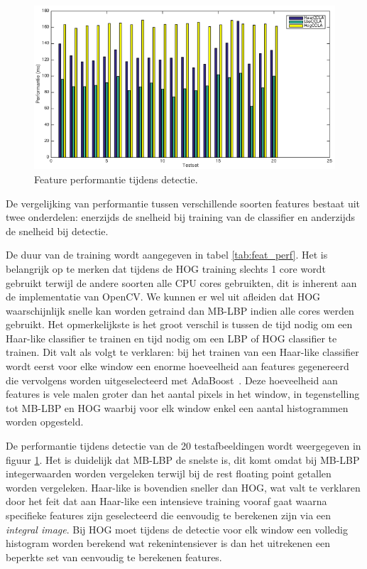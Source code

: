 \begin{figure}
  \centering
  \includegraphics[width=\linewidth]{img/FeaturePerf}
  \caption{Feature performantie tijdens detectie.}
  \label{fig:featPerf}
\end{figure}

De vergelijking van performantie tussen verschillende soorten features bestaat uit twee onderdelen: enerzijds de snelheid bij training van de classifier en anderzijds de snelheid bij detectie.

De duur van de training wordt aangegeven in tabel \ref{tab:feat_perf}. Het is belangrijk op te merken dat tijdens de HOG training slechts 1 core wordt gebruikt terwijl de andere soorten alle CPU cores gebruikten, dit is inherent aan de implementatie van OpenCV. We kunnen er wel uit afleiden dat HOG waarschijnlijk snelle kan worden getraind dan MB-LBP indien alle cores werden gebruikt. Het opmerkelijkste is het groot verschil is tussen de tijd nodig om een Haar-like classifier te trainen en tijd nodig om een LBP of HOG classifier te trainen. Dit valt als volgt te verklaren: bij het trainen van een Haar-like classifier wordt eerst voor elke window een enorme hoeveelheid aan features gegenereerd die vervolgens worden uitgeselecteerd met AdaBoost~\cite{freund1995desicion}. Deze hoeveelheid aan features is vele malen groter dan het aantal pixels in het window, in tegenstelling tot MB-LBP en HOG waarbij voor elk window enkel een aantal histogrammen worden opgesteld.

De performantie tijdens detectie van de 20 testafbeeldingen wordt weergegeven in figuur \ref{fig:featPerf}. Het is duidelijk dat MB-LBP de snelste is, dit komt omdat bij MB-LBP integerwaarden worden vergeleken terwijl bij de rest floating point getallen worden vergeleken. Haar-like is bovendien sneller dan HOG, wat valt te verklaren door het feit dat aan Haar-like een intensieve training vooraf gaat waarna specifieke features zijn geselecteerd die eenvoudig te berekenen zijn via een \textit{integral image}. Bij HOG  moet tijdens de detectie voor elk window een volledig histogram worden berekend wat rekenintensiever is dan het uitrekenen een beperkte set van eenvoudig te berekenen features.

